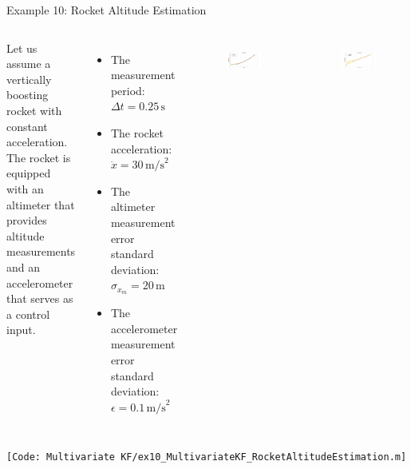 \begin{frame}{Example 10: Rocket Altitude Estimation}
\begin{columns}
Let us assume a vertically boosting rocket with constant acceleration. The rocket is equipped with an altimeter that provides altitude measurements and an accelerometer that serves as a control input.
\begin{itemize}
    \item The measurement period: \(\Delta t = 0.25 \, \text{s}\)
    \item The rocket acceleration: \(\ddot{x} = 30 \, \text{m/s}^2\)
    \item The altimeter measurement error standard deviation: \(\sigma_{x_m} = 20 \, \text{m}\)
    \item The accelerometer measurement error standard deviation: \(\epsilon = 0.1 \, \text{m/s}^2\)
\end{itemize}
\begin{figure}
    \centering
    \includegraphics[width=1\linewidth]{Figures//Chapter3/Ex10_RocketAltitude.png}
    \label{fig:enter-label}
\end{figure}
\vspace{-10pt}
\begin{figure}
    \centering
    \includegraphics[width=1\linewidth]{Figures//Chapter3/Ex10_RocketVelocity.png}
    \label{fig:enter-label}
\end{figure}


\end{columns}
\texttt{\tiny [Code: Multivariate KF/ex10\_MultivariateKF\_RocketAltitudeEstimation.m]}
\end{frame}